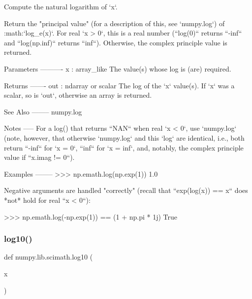 \begin{DoxyVerb}Compute the natural logarithm of `x`.

Return the "principal value" (for a description of this, see `numpy.log`)
of :math:`log_e(x)`. For real `x > 0`, this is a real number (``log(0)``
returns ``-inf`` and ``log(np.inf)`` returns ``inf``). Otherwise, the
complex principle value is returned.

Parameters
----------
x : array_like
   The value(s) whose log is (are) required.

Returns
-------
out : ndarray or scalar
   The log of the `x` value(s). If `x` was a scalar, so is `out`,
   otherwise an array is returned.

See Also
--------
numpy.log

Notes
-----
For a log() that returns ``NAN`` when real `x < 0`, use `numpy.log`
(note, however, that otherwise `numpy.log` and this `log` are identical,
i.e., both return ``-inf`` for `x = 0`, ``inf`` for `x = inf`, and,
notably, the complex principle value if ``x.imag != 0``).

Examples
--------
>>> np.emath.log(np.exp(1))
1.0

Negative arguments are handled "correctly" (recall that
``exp(log(x)) == x`` does *not* hold for real ``x < 0``):

>>> np.emath.log(-np.exp(1)) == (1 + np.pi * 1j)
True\end{DoxyVerb}
 \mbox{\label{namespacenumpy_1_1lib_1_1scimath_a8eb4fdbb200982738232bd19e56fce16}} 
\subsubsection{\texorpdfstring{log10()}{log10()}}
{\footnotesize\ttfamily def numpy.\+lib.\+scimath.\+log10 (\begin{DoxyParamCaption}\item[{}]{x }\end{DoxyParamCaption})}

